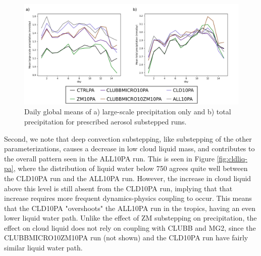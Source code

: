 \documentclass [11pt, proquest] {uwthesis}[2020/02/24]
\begin{document}
\begin{figure}
    \centering
    \includegraphics[width=5.5in]{Figure13.png}
    \caption{Daily global means of a) large-scale precipitation only and b) total precipitation for prescribed aerosol substepped runs.}
    \label{fig:precl-prect-pa}
\end{figure}

Second, we note that deep convection substepping, like substepping of the other parameterizations, causes a decrease in low cloud liquid mass, and contributes to the overall pattern seen in the ALL10PA run. This is seen in Figure \ref{fig:cldliq-pa}, where the distribution of liquid water below \SI{750}{\millibar} agrees quite well between the CLD10PA run and the ALL10PA run. However, the increase in cloud liquid above this level is still absent from the CLD10PA run, implying that that increase requires more frequent dynamics-physics coupling to occur. This means that the CLD10PA "overshoots" the ALL10PA run in the tropics, having an even lower liquid water path. Unlike the effect of ZM substepping on precipitation, the effect on cloud liquid does not rely on coupling with CLUBB and MG2, since the CLUBBMICRO10ZM10PA run (not shown) and the CLD10PA run have fairly similar liquid water path.
\end{document}

